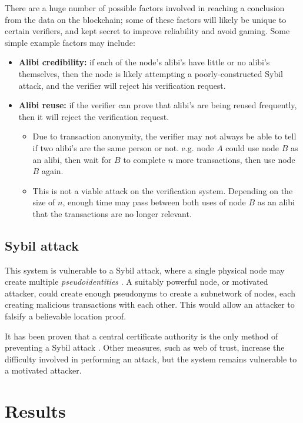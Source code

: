 \documentclass[12pt]{article}
\begin{document}
There are a huge number of possible factors involved in reaching a conclusion from the data on the blockchain; some of these factors will likely be unique to certain verifiers, and kept secret to improve reliability and avoid gaming. Some simple example factors may include:
\begin{itemize}
	\item \textbf{Alibi credibility:} if each of the node’s alibi’s have little or no alibi’s themselves, then the node is likely attempting a poorly-constructed Sybil attack, and the verifier will reject his verification request.
	\item \textbf{Alibi reuse:} if the verifier can prove that alibi’s are being reused frequently, then it will reject the verification request.
	\begin{itemize}
		\item Due to transaction anonymity, the verifier may not always be able to tell if two alibi's are the same person or not. e.g. node $A$ could use node $B$ as an alibi, then wait for $B$ to complete $n$ more transactions, then use node $B$ again.
		\item This is not a viable attack on the verification system. Depending on the size of $n$, enough time may pass between both uses of node $B$ as an alibi that the transactions are no longer relevant.
	\end{itemize}
\end{itemize}

\subsection{Sybil attack}
This system is vulnerable to a Sybil attack, where a single physical node may create multiple \textit{pseudoidentities} \cite{sybil}. A suitably powerful node, or motivated attacker, could create enough pseudonyms to create a subnetwork of nodes, each creating malicious transactions with each other. This would allow an attacker to falsify a believable location proof.

It has been proven that a central certificate authority is the only method of preventing a Sybil attack \cite{sybil}. Other measures, such as web of trust, increase the difficulty involved in performing an attack, but the system remains vulnerable to a motivated attacker.

\section{Results}
\end{document}
